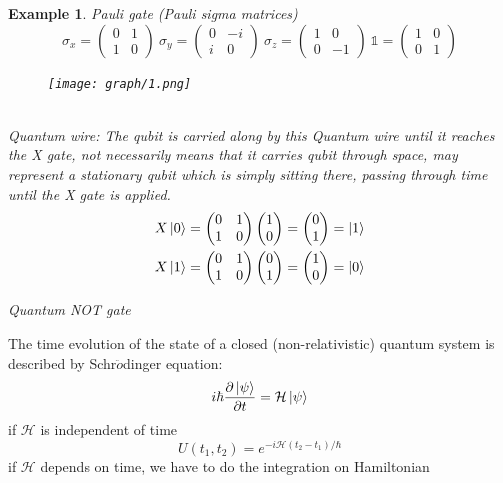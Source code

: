 \documentclass[]{book}
\newtheorem*{example}{Example}
\theoremstyle{nonumberplain}
\begin{document}
\begin{example}
	Pauli gate (Pauli sigma matrices) \\
\[
\sigma_{x}=
\begin{pmatrix}
	0 & 1\\
	1 & 0
\end{pmatrix}
\ \sigma_{y}=
\begin{pmatrix}
	0 & -i\\
	i & 0
\end{pmatrix}
\ \sigma_{z}=
\begin{pmatrix}
	1 & 0\\
	0 & -1 
\end{pmatrix}
\ \mathds{1}=
\begin{pmatrix}
	1 & 0\\
	0 & 1 
\end{pmatrix}
\] 
\begin{figure}[!hbt]
	\centering
	\texttt{[image: graph/1.png]}
\end{figure}
\\
Quantum wire: The qubit is carried along by this Quantum wire until it reaches the X gate, not necessarily means that it carries qubit through space, may represent a stationary qubit which is simply sitting there, passing through time until the X gate is applied.
\begin{equation*}
\begin{aligned}
	X\ket{0} &= 
\begin{pmatrix}
	0 & 1 \\
	1 & 0 
\end{pmatrix}
\begin{pmatrix}
1 \\
0
\end{pmatrix}
=
\begin{pmatrix}
0 \\
1
\end{pmatrix}
=\ket{1} 
\\
X\ket{1} &= 
\begin{pmatrix}
	0 & 1 \\
	1 & 0 
\end{pmatrix}
\begin{pmatrix}
0 \\
1
\end{pmatrix}
=
\begin{pmatrix}
1 \\
0
\end{pmatrix}
= \ket{0}
\end{aligned}
\end{equation*}
\begin{center}
Quantum NOT gate
\end{center}
\end{example}
\begin{postu}[2']
	The time evolution of the state of a closed (non-relativistic) quantum system is described by Schr$\ddot{o}$dinger equation:
\[
i\hbar\frac{\partial \ket{\psi}}{\partial t} = \mathcal{H}\ket{\psi}
\] 
if $\mathcal{H}$ is independent of time
\[
	U(t_{1},t_{2}) = e^{-i\mathcal{H}(t_{2}-t_{1})/\hbar}
\] 
if $\mathcal{H}$ depends on time, we have to do the integration on Hamiltonian
\end{postu}
\end{document}
